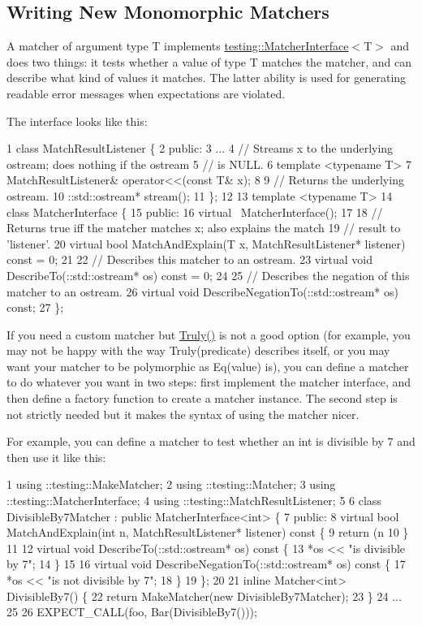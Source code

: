 \subsection*{Writing New Monomorphic Matchers}

A matcher of argument type {\ttfamily T} implements {\ttfamily \hyperlink{classtesting_1_1_matcher_interface}{testing\+::\+Matcher\+Interface}$<$T$>$} and does two things\+: it tests whether a value of type {\ttfamily T} matches the matcher, and can describe what kind of values it matches. The latter ability is used for generating readable error messages when expectations are violated.

The interface looks like this\+:


\begin{DoxyCode}
1 class MatchResultListener \{
2  public:
3   ...
4   // Streams x to the underlying ostream; does nothing if the ostream
5   // is NULL.
6   template <typename T>
7   MatchResultListener& operator<<(const T& x);
8 
9   // Returns the underlying ostream.
10   ::std::ostream* stream();
11 \};
12 
13 template <typename T>
14 class MatcherInterface \{
15  public:
16   virtual ~MatcherInterface();
17 
18   // Returns true iff the matcher matches x; also explains the match
19   // result to 'listener'.
20   virtual bool MatchAndExplain(T x, MatchResultListener* listener) const = 0;
21 
22   // Describes this matcher to an ostream.
23   virtual void DescribeTo(::std::ostream* os) const = 0;
24 
25   // Describes the negation of this matcher to an ostream.
26   virtual void DescribeNegationTo(::std::ostream* os) const;
27 \};
\end{DoxyCode}


If you need a custom matcher but {\ttfamily \hyperlink{namespacetesting_a5faf05cfaae6074439960048e478b1c8}{Truly()}} is not a good option (for example, you may not be happy with the way {\ttfamily Truly(predicate)} describes itself, or you may want your matcher to be polymorphic as {\ttfamily Eq(value)} is), you can define a matcher to do whatever you want in two steps\+: first implement the matcher interface, and then define a factory function to create a matcher instance. The second step is not strictly needed but it makes the syntax of using the matcher nicer.

For example, you can define a matcher to test whether an {\ttfamily int} is divisible by 7 and then use it like this\+: 
\begin{DoxyCode}
1 using ::testing::MakeMatcher;
2 using ::testing::Matcher;
3 using ::testing::MatcherInterface;
4 using ::testing::MatchResultListener;
5 
6 class DivisibleBy7Matcher : public MatcherInterface<int> \{
7  public:
8   virtual bool MatchAndExplain(int n, MatchResultListener* listener) const \{
9     return (n %
10   \}
11 
12   virtual void DescribeTo(::std::ostream* os) const \{
13     *os << "is divisible by 7";
14   \}
15 
16   virtual void DescribeNegationTo(::std::ostream* os) const \{
17     *os << "is not divisible by 7";
18   \}
19 \};
20 
21 inline Matcher<int> DivisibleBy7() \{
22   return MakeMatcher(new DivisibleBy7Matcher);
23 \}
24 ...
25 
26   EXPECT\_CALL(foo, Bar(DivisibleBy7()));
\end{DoxyCode}



